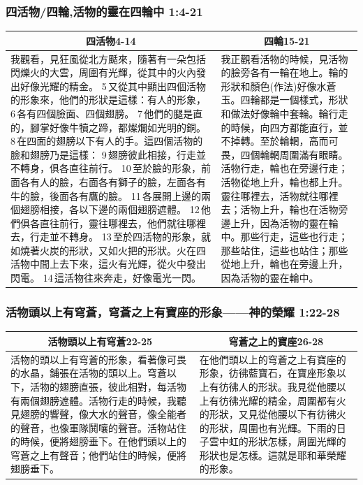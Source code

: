 \subsubsection{四活物/四輪,活物的靈在四輪中 1:4-21}
\begin{table}[H]
\centering
\begin{tabular}{p{10.75cm}|p{6.50cm}}\hline\hline
\multicolumn{1}{c|}{四活物4-14}&\multicolumn{1}{c}{四輪15-21}\\\hline
我觀看，見狂風從北方颳來，隨著有一朵包括閃爍火的大雲，周圍有光輝，從其中的火內發出好像光耀的精金。 5 又從其中顯出四個活物的形象來，他們的形狀是這樣：有人的形象， 6 各有四個臉面、四個翅膀。 7 他們的腿是直的，腳掌好像牛犢之蹄，都燦爛如光明的銅。 8 在四面的翅膀以下有人的手。這四個活物的臉和翅膀乃是這樣： 9 翅膀彼此相接，行走並不轉身，俱各直往前行。 10 至於臉的形象，前面各有人的臉，右面各有獅子的臉，左面各有牛的臉，後面各有鷹的臉。 11 各展開上邊的兩個翅膀相接，各以下邊的兩個翅膀遮體。 12 他們俱各直往前行，靈往哪裡去，他們就往哪裡去，行走並不轉身。 13 至於四活物的形象，就如燒著火炭的形狀，又如火把的形狀。火在四活物中間上去下來，這火有光輝，從火中發出閃電。 14 這活物往來奔走，好像電光一閃。
&我正觀看活物的時候，見活物的臉旁各有一輪在地上。輪的形狀和顏色(作法)好像水蒼玉。四輪都是一個樣式，形狀和做法好像輪中套輪。輪行走的時候，向四方都能直行，並不掉轉。至於輪輞，高而可畏，四個輪輞周圍滿有眼睛。活物行走，輪也在旁邊行走；活物從地上升，輪也都上升。靈往哪裡去，活物就往哪裡去；活物上升，輪也在活物旁邊上升，因為活物的靈在輪中。那些行走，這些也行走；那些站住，這些也站住；那些從地上升，輪也在旁邊上升，因為活物的靈在輪中。\\\hline
\end{tabular}
\end{table}


\subsubsection{活物頭以上有穹蒼，穹蒼之上有寶座的形象——神的榮耀 1:22-28}
\begin{table}[H]
\centering
\begin{tabular}{p{9cm}|p{8.250cm}}\hline\hline
\multicolumn{1}{c|}{活物頭以上有穹蒼22-25}&\multicolumn{1}{c}{穹蒼之上的寶座26-28}\\\hline
活物的頭以上有穹蒼的形象，看著像可畏的水晶，鋪張在活物的頭以上。穹蒼以下，活物的翅膀直張，彼此相對，每活物有兩個翅膀遮體。活物行走的時候，我聽見翅膀的響聲，像大水的聲音，像全能者的聲音，也像軍隊鬨嚷的聲音。活物站住的時候，便將翅膀垂下。在他們頭以上的穹蒼之上有聲音；他們站住的時候，便將翅膀垂下。
&在他們頭以上的穹蒼之上有寶座的形象，彷彿藍寶石，在寶座形象以上有彷彿人的形狀。我見從他腰以上有彷彿光耀的精金，周圍都有火的形狀，又見從他腰以下有彷彿火的形狀，周圍也有光輝。下雨的日子雲中虹的形狀怎樣，周圍光輝的形狀也是怎樣。這就是耶和華榮耀的形象。\\\hline
\end{tabular}
\end{table}


